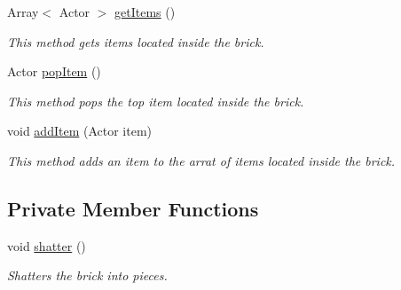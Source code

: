 \begin{DoxyCompactItemize}
Array$<$ Actor $>$ \hyperlink{classnl_1_1arjanfrans_1_1mario_1_1model_1_1Brick_ab7c75746c482b7e43dc22937cf100624}{get\+Items} ()
\begin{DoxyCompactList}\small\item\em This method gets items located inside the brick. \end{DoxyCompactList}\item 
Actor \hyperlink{classnl_1_1arjanfrans_1_1mario_1_1model_1_1Brick_aae68460b9c629b1bc3b81bbcdc168554}{pop\+Item} ()
\begin{DoxyCompactList}\small\item\em This method pops the top item located inside the brick. \end{DoxyCompactList}\item 
void \hyperlink{classnl_1_1arjanfrans_1_1mario_1_1model_1_1Brick_adb38a0e3d30ff07d38ad8d4549642afd}{add\+Item} (Actor item)
\begin{DoxyCompactList}\small\item\em This method adds an item to the arrat of items located inside the brick. \end{DoxyCompactList}\end{DoxyCompactItemize}
\subsection*{Private Member Functions}
\begin{DoxyCompactItemize}
\item 
\mbox{\label{classnl_1_1arjanfrans_1_1mario_1_1model_1_1Brick_a29d45291a530d66038ac80b41d3b7da7}} 
void \hyperlink{classnl_1_1arjanfrans_1_1mario_1_1model_1_1Brick_a29d45291a530d66038ac80b41d3b7da7}{shatter} ()
\begin{DoxyCompactList}\small\item\em Shatters the brick into pieces. \end{DoxyCompactList}\end{DoxyCompactItemize}
